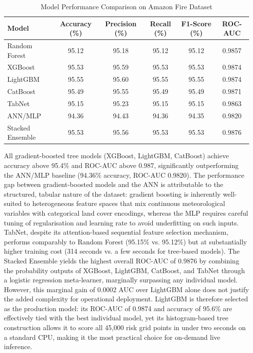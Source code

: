 \documentclass[12pt,a4paper]{article}
\begin{document}
\begin{table}[H]
\centering
\caption{Model Performance Comparison on Amazon Fire Dataset}
\label{tab:models}
\begin{tabular}{lccccc}
\toprule
\textbf{Model} & \textbf{Accuracy (\%)} & \textbf{Precision (\%)} & \textbf{Recall (\%)} & \textbf{F1-Score (\%)} & \textbf{ROC-AUC} \\
\midrule
Random Forest    & 95.12 & 95.18 & 95.12 & 95.12 & 0.9857 \\
XGBoost          & 95.53 & 95.59 & 95.53 & 95.53 & 0.9874 \\
LightGBM         & 95.55 & 95.60 & 95.55 & 95.55 & 0.9874 \\
CatBoost         & 95.49 & 95.55 & 95.49 & 95.49 & 0.9871 \\
TabNet           & 95.15 & 95.23 & 95.15 & 95.15 & 0.9863 \\
ANN/MLP          & 94.36 & 94.43 & 94.36 & 94.35 & 0.9820 \\
Stacked Ensemble & 95.53 & 95.56 & 95.53 & 95.53 & 0.9876 \\
\bottomrule
\end{tabular}
\end{table}

All gradient-boosted tree models (XGBoost, LightGBM, CatBoost) achieve accuracy above 95.4\% and ROC-AUC above 0.987, significantly outperforming the ANN/MLP baseline (94.36\% accuracy, ROC-AUC 0.9820). The performance gap between gradient-boosted models and the ANN is attributable to the structured, tabular nature of the dataset: gradient boosting is inherently well-suited to heterogeneous feature spaces that mix continuous meteorological variables with categorical land cover encodings, whereas the MLP requires careful tuning of regularisation and learning rate to avoid underfitting on such inputs. TabNet, despite its attention-based sequential feature selection mechanism, performs comparably to Random Forest (95.15\% vs. 95.12\%) but at substantially higher training cost (314 seconds vs. a few seconds for tree-based models). The Stacked Ensemble yields the highest overall ROC-AUC of 0.9876 by combining the probability outputs of XGBoost, LightGBM, CatBoost, and TabNet through a logistic regression meta-learner, marginally surpassing any individual model. However, this marginal gain of 0.0002 AUC over LightGBM alone does not justify the added complexity for operational deployment. LightGBM is therefore selected as the production model: its ROC-AUC of 0.9874 and accuracy of 95.6\% are effectively tied with the best individual model, yet its histogram-based tree construction allows it to score all 45,000 risk grid points in under two seconds on a standard CPU, making it the most practical choice for on-demand live inference.
\end{document}
